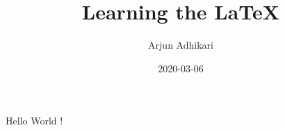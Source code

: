 \documentclass{article}
\title{Learning the LaTeX}
\author{Arjun Adhikari}
\date{2020-03-06}
\begin{document}
	\maketitle
	\newpage
	
	Hello World !
\end{document}
